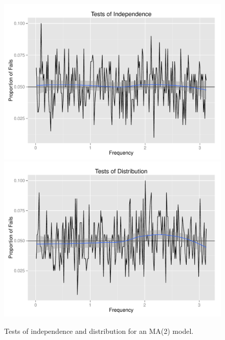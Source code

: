 \documentclass{article}\usepackage[]{graphicx}\usepackage[]{color}
\newenvironment{knitrout}{}{} %
\theoremstyle{plain}
\begin{document}
\begin{knitrout}
\color{fgcolor}\begin{figure}[H]

\includegraphics[width=.49\textwidth]{figure/tests-ma21} 
\includegraphics[width=.49\textwidth]{figure/tests-ma22} \caption[Tests of independence and distribution for an MA(2) model]{Tests of independence and distribution for an MA(2) model.\label{fig:tests-ma2}}
\end{figure}


\end{knitrout}
\end{document}
